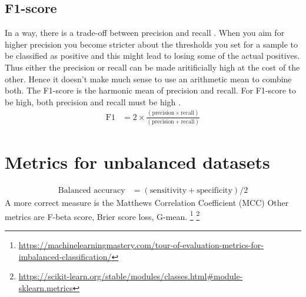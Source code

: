 \documentclass{../template/texnote}
\begin{document}
\subsection{F1-score}
In a way, there is a trade-off between precision and recall .
When you aim for higher precision you become stricter about the thresholds you set for a sample to be classified as positive and this might lead to losing some of the actual positives.
Thus either the precision or recall can be made aritificially high at the cost of the other. Hence it doesn't make much sense to use an arithmetic mean to combine both.
The F1-score is the harmonic mean of precision and recall. For F1-score to be high, both precision and recall must be high .
\begin{align}
    \textrm{F1} &= 2 \times \frac{(\textrm{precision} \times \textrm{recall})}{(\textrm{precision} + \textrm{recall})}
\end{align}
\section{Metrics for unbalanced datasets}
\begin{align}
    \textrm{Balanced accuracy} &= (\textrm{sensitivity} + \textrm{specificity}) / 2
\end{align}
    A more correct measure is the Matthews Correlation Coefficient (MCC)  
    Other metrics are F-beta score, Brier score loss, G-mean.
    \footnote{\url{https://machinelearningmastery.com/tour-of-evaluation-metrics-for-imbalanced-classification/}}
    \footnote{\url{https://scikit-learn.org/stable/modules/classes.html\#module-sklearn.metrics}}
\end{document}
